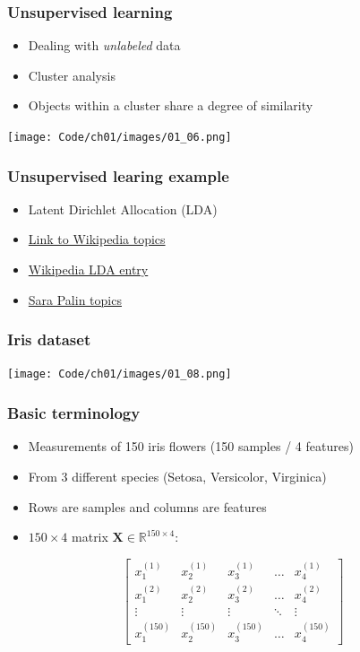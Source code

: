 \documentclass{beamer}
\begin{document}
\begin{frame}
  \frametitle{Unsupervised learning}
  \begin{itemize}
  \item Dealing with \textit{unlabeled} data
  \item Cluster analysis
  \item Objects within a cluster share a degree of similarity
  \end{itemize}
  \center
  \texttt{[image: Code/ch01/images/01\_06.png]}
\end{frame}

\begin{frame}
  \frametitle{Unsupervised learing example}
  \begin{itemize}
  \item Latent Dirichlet Allocation (LDA)
  \item \href{http://www.princeton.edu/~achaney/tmve/wiki100k/browse/topic-presence.html}{Link to Wikipedia topics}
  \item \href {https://en.wikipedia.org/wiki/Latent_Dirichlet_allocation}{Wikipedia LDA entry}
    \item \href{http://blog.echen.me/2011/06/27/topic-modeling-the-sarah-palin-emails/}{Sara Palin topics}
  \end{itemize}
\end{frame}

\begin{frame}
  \frametitle{Iris dataset}
  \texttt{[image: Code/ch01/images/01\_08.png]}
\end{frame}

\begin{frame}
  \frametitle{Basic terminology}
  \begin{itemize}
  \item Measurements of 150 iris flowers (150 samples / 4 features)
  \item From 3 different species (Setosa, Versicolor, Virginica)
  \item Rows are samples and columns are features
  \item $150 \times 4$ matrix $\mathbf{X} \in \mathbb{R}^{150 \times 4}:$
  \end{itemize}

  \[
  \begin{bmatrix}
    x_{1}^{(1)} & x_{2}^{(1)} & x_{3}^{(1)} & \dots  & x_{4}^{(1)} \\
    x_{1}^{(2)} & x_{2}^{(2)} & x_{3}^{(2)} & \dots  & x_{4}^{(2)} \\
    \vdots & \vdots & \vdots & \ddots & \vdots \\
    x_{1}^{(150)} & x_{2}^{(150)} & x_{3}^{(150)} & \dots  & x_{4}^{(150)}
  \end{bmatrix}
  \]
\end{frame}
\end{document}
